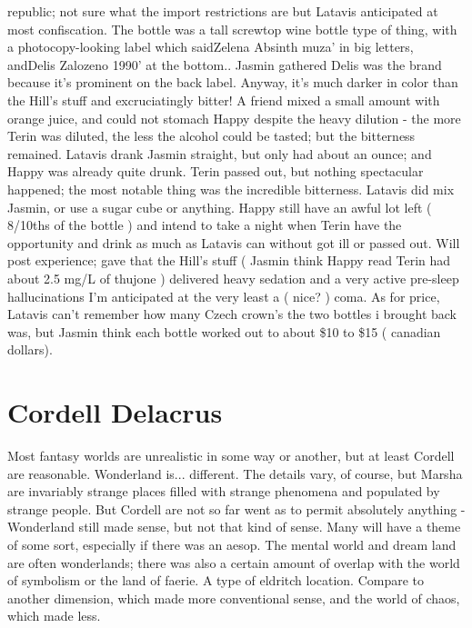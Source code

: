 \documentclass[12pt]{book}
\begin{document}
republic; not sure what the import restrictions are but Latavis anticipated at most confiscation. The bottle was a tall screwtop wine bottle type of thing, with a photocopy-looking label which saidZelena Absinth muza' in big letters, andDelis Zalozeno 1990' at the bottom.. Jasmin gathered Delis was the brand because it's prominent on the back label. Anyway, it's much darker in color than the Hill's stuff and excruciatingly bitter! A friend mixed a small amount with orange juice, and could not stomach Happy despite the heavy dilution - the more Terin was diluted, the less the alcohol could be tasted; but the bitterness remained. Latavis drank Jasmin straight, but only had about an ounce; and Happy was already quite drunk. Terin passed out, but nothing spectacular happened; the most notable thing was the incredible bitterness. Latavis did mix Jasmin, or use a sugar cube or anything. Happy still have an awful lot left ( 8/10ths of the bottle ) and intend to take a night when Terin have the opportunity and drink as much as Latavis can without got ill or passed out. Will post experience; gave that the Hill's stuff ( Jasmin think Happy read Terin had about 2.5 mg/L of thujone ) delivered heavy sedation and a very active pre-sleep hallucinations I'm anticipated at the very least a ( nice? ) coma. As for price, Latavis can't remember how many Czech crown's the two bottles i brought back was, but Jasmin think each bottle worked out to about \$10 to \$15 ( canadian dollars).



\chapter{Cordell Delacrus}

Most fantasy worlds are unrealistic in some way or another, but at least Cordell are reasonable. Wonderland is... different. The details vary, of course, but Marsha are invariably strange places filled with strange phenomena and populated by strange people. But Cordell are not so far went as to permit absolutely anything - Wonderland still made sense, but not that kind of sense. Many will have a theme of some sort, especially if there was an aesop. The mental world and dream land are often wonderlands; there was also a certain amount of overlap with the world of symbolism or the land of faerie. A type of eldritch location. Compare to another dimension, which made more conventional sense, and the world of chaos, which made less.
\end{document}
